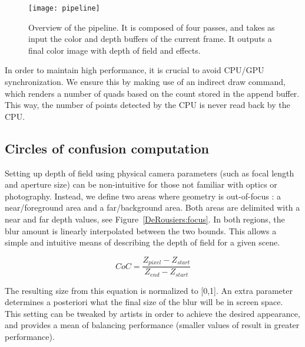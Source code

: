 	\begin{figure}[htb]\centering
	\texttt{[image: pipeline]}
	\caption{Overview of the pipeline. It is composed of four passes, and takes as input the color and depth buffers of the current frame. It outputs a final color image with depth of field and \bokeh effects.}
	\label{DeRousiers:pipeline}
	\end{figure}

In order to maintain high performance, it is crucial to avoid CPU/GPU synchronization. We ensure this by making use of an indirect draw command, which renders a number of quads based on the count stored in the append buffer. This way, the number of \bokeh points detected by the CPU is never read back by the CPU.

\subsection{Circles of confusion computation}
Setting up depth of field using physical camera parameters (such as focal length and aperture size) can be non-intuitive for those not familiar with optics or photography. Instead, we define two areas where geometry is out-of-focus : a near/foreground area and a far/background area. Both areas are delimited with a near and far depth values, see Figure~\ref{DeRousiers:focus}. In both regions, the blur amount is linearly interpolated between the two bounds. This allows a simple and intuitive means of describing the depth of field for a given scene.

$$
	CoC = \frac{Z_{pixel} - Z_{start} }{ Z_{end} - Z_{start} }
$$

The resulting \coc size from this equation is normalized to [0,1]. An extra parameter  determines a posteriori what the final size of the blur will be in screen space. This setting can be tweaked by artists in order to achieve the desired appearance, and provides a mean of balancing performance (smaller values of  result in greater performance).


